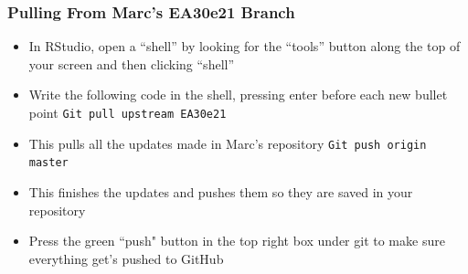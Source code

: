 \documentclass[12pt]{../SOP4_alpha}\usepackage[]{graphicx}\usepackage[]{xcolor}
\begin{document}
\subsubsection{Pulling From Marc's EA30e21 Branch}

\begin{itemize}

\item In RStudio, open a ``shell'' by looking for the ``tools'' button along the top of your screen and then clicking ``shell''
\item Write the following code in the shell, pressing enter before each new bullet point 
  \indent\verb"Git pull upstream EA30e21"
    \item This pulls all the updates made in Marc's repository
  \indent\verb"Git push origin master" 
    \item This finishes the updates and pushes them so they are saved in your repository
\item Press the green ``push" button in the top right box under git to make sure everything get's pushed to GitHub
\end{itemize}
\end{document}
